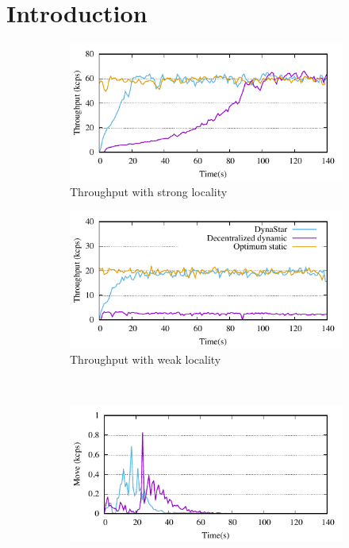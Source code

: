 \section{Introduction}


\begin{figure}[ht!]
  \centering
  \begin{subfigure}[b]{0.45\textwidth}
    \centering
    \includegraphics[width=0.95\columnwidth]{figures/experiments/dynastar-vs-dssmr-4p-0-tp}
    \caption{Throughput with strong locality}
  \end{subfigure}
  \begin{subfigure}[b]{0.45\textwidth}
    \centering
    \includegraphics[width=0.95\columnwidth]{figures/experiments/dynastar-vs-dssmr-4p-5-tp}
    \caption{Throughput with weak locality}
  \end{subfigure} \\
  \begin{subfigure}[b]{0.45\textwidth}
    \centering
    \includegraphics[width=0.95\columnwidth]{figures/experiments/dynastar-vs-dssmr-4p-0-move}

\end{subfigure}
\end{figure}
